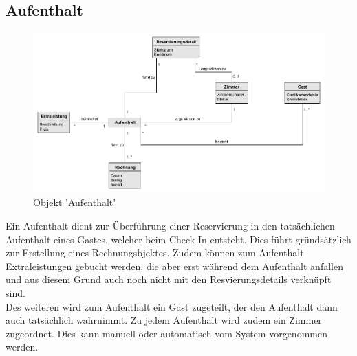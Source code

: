 \documentclass[../../Pflichtenheft.tex]{subfiles}
\begin{document}
    \subsection{Aufenthalt}
    \begin{figure}[ht!]
        \begin{center}
            \includegraphics[width=0.5\linewidth]{assets/aufenthalt.png}
            \caption{Objekt 'Aufenthalt'} \label{aufenthalt_model}
        \end{center}
    \end{figure}
    Ein Aufenthalt dient zur Überführung einer Reservierung in den tatsächlichen Aufenthalt eines
    Gastes, welcher beim Check-In entsteht. Dies führt gründsätzlich zur Erstellung eines Rechnungsbjektes.
    Zudem können zum Aufenthalt Extraleistungen gebucht werden, die aber erst während dem
    Aufenthalt anfallen und aus diesem Grund auch noch nicht mit den Resvierungsdetails verknüpft sind.
    \\Des weiteren wird zum Aufenthalt ein Gast zugeteilt, der den Aufenthalt dann auch tatsächlich wahrnimmt.
    Zu jedem Aufenthalt wird zudem ein Zimmer zugeordnet. Dies kann manuell oder automatisch vom System vorgenommen
    werden.
\end{document}
